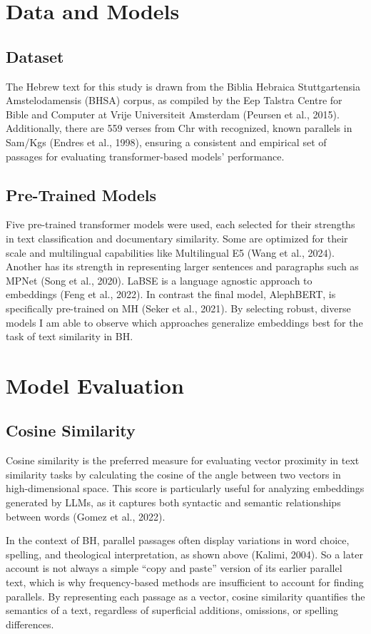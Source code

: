 \documentclass[12pt]{article}
\begin{document}
\section{Data and Models}
\subsection{Dataset}
The Hebrew text for this study is drawn from the Biblia Hebraica Stuttgartensia Amstelodamensis (BHSA) corpus, as compiled by the Eep Talstra Centre for Bible and Computer at Vrije Universiteit Amsterdam (Peursen et al., 2015). Additionally, there are 559 verses from Chr with recognized, known parallels in Sam/Kgs (Endres et al., 1998), ensuring a consistent and empirical set of passages for evaluating transformer-based models’ performance.

\subsection{Pre-Trained Models}
Five pre-trained transformer models were used, each selected for their strengths in text classification and documentary similarity. Some are optimized for their scale and multilingual capabilities like Multilingual E5 (Wang et al., 2024). Another has its strength in representing larger sentences and paragraphs such as MPNet (Song et al., 2020).  LaBSE is a language agnostic approach to embeddings (Feng et al., 2022). In contrast the final model, AlephBERT, is specifically pre-trained on MH (Seker et al., 2021). By selecting robust, diverse models I am able to observe which approaches generalize embeddings best for the task of text similarity in BH.

\section{Model Evaluation}
\subsection{Cosine Similarity}
Cosine similarity is the preferred measure for evaluating vector proximity in text similarity tasks by calculating the cosine of the angle between two vectors in high-dimensional space. This score is particularly useful for analyzing embeddings generated by LLMs, as it captures both syntactic and semantic relationships between words (Gomez et al., 2022).

In the context of BH, parallel passages often display variations in word choice, spelling, and theological interpretation, as shown above (Kalimi, 2004). So a later account is not always a simple “copy and paste” version of its earlier parallel text, which is why frequency-based methods are insufficient to account for finding parallels. By representing each passage as a vector, cosine similarity quantifies the semantics of a text, regardless of superficial additions, omissions, or spelling differences.
\end{document}
